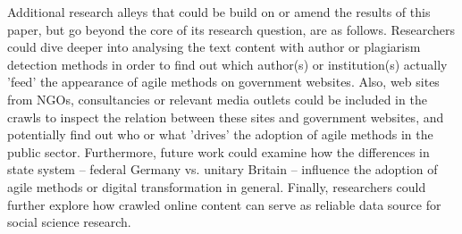 Additional research alleys that could be build on or amend the results of this paper, but go beyond the core of its research question, are as follows. Researchers could dive deeper into analysing the text content with author or plagiarism detection methods in order to find out which author(s) or institution(s) actually 'feed' the appearance of agile methods on government websites. Also, web sites from NGOs, consultancies or relevant media outlets could be included in the crawls to inspect the relation between these sites and government websites, and potentially find out who or what 'drives' the adoption of agile methods in the public sector. Furthermore, future work could examine how the differences in state system – federal Germany vs. unitary Britain – influence the adoption of agile methods or digital transformation in general. Finally, researchers could further explore how crawled online content can serve as reliable data source for social science research.